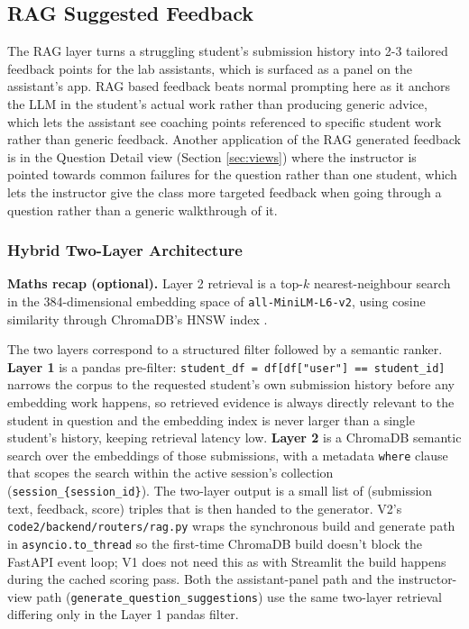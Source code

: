 \subsection{RAG Suggested Feedback} \label{sec:rag}

The RAG layer turns a struggling student's submission history into 2-3 tailored feedback points for the lab assistants, which is surfaced as a panel on the assistant's app.
RAG based feedback beats normal prompting here as it anchors the LLM in the student's actual work rather than producing generic advice, which lets the assistant see coaching points referenced to specific student work rather than generic feedback.
Another application of the RAG generated feedback is in the Question Detail view (Section \ref{sec:views}) where the instructor is pointed towards common failures for the question rather than one student, which lets the instructor give the class more targeted feedback when going through a question rather than a generic walkthrough of it.

\subsubsection{Hybrid Two-Layer Architecture}

\textbf{Maths recap (optional).}
Layer 2 retrieval is a top-$k$ nearest-neighbour search in the 384-dimensional embedding space of \texttt{all-MiniLM-L6-v2}, using cosine similarity through ChromaDB's HNSW index \cite{lewisRetrievalAugmentedGenerationKnowledgeIntensive2020}. 

The two layers correspond to a structured filter followed by a semantic ranker. 
\textbf{Layer 1} is a pandas pre-filter: \texttt{student\_df = df[df["user"] == student\_id]} narrows the corpus to the requested student's own submission history before any embedding work happens, so retrieved evidence is always directly relevant to the student in question and the embedding index is never larger than a single student's history, keeping retrieval latency low. 
\textbf{Layer 2} is a ChromaDB semantic search over the embeddings of those submissions, with a metadata \texttt{where} clause that scopes the search within the active session's collection (\texttt{session\_\{session\_id\}}).
The two-layer output is a small list of (submission text, feedback, score) triples that is then handed to the generator. 
V2's \texttt{code2/backend/routers/rag.py} wraps the synchronous build and generate path in \texttt{asyncio.to\_thread} so the first-time ChromaDB build doesn't block the FastAPI event loop; V1 does not need this as with Streamlit the build happens during the cached scoring pass.
Both the assistant-panel path and the instructor-view path (\texttt{generate\_question\_suggestions}) use the same two-layer retrieval differing only in the Layer 1 pandas filter.

